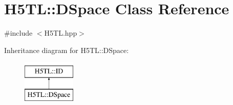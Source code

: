 \hypertarget{class_h5_t_l_1_1_d_space}{\section{H5\-T\-L\-:\-:D\-Space Class Reference}
\label{class_h5_t_l_1_1_d_space}
}


{\ttfamily \#include $<$H5\-T\-L.\-hpp$>$}

Inheritance diagram for H5\-T\-L\-:\-:D\-Space\-:\begin{figure}[H]
\begin{center}
\leavevmode
\includegraphics[height=2.000000cm]{class_h5_t_l_1_1_d_space}
\end{center}
\end{figure}
